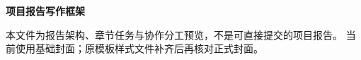 \documentclass[12pt,a4paper,UTF8]{ctexart}
\newif\ifRUCTemplate
\begin{document}
\ifRUCTemplate
  \cover
\else
  \begin{titlepage}
  \centering
  \vspace*{18mm}
  {\bfseries \CourseName\par}
  \vspace{22mm}
  {\bfseries 项目报告写作框架\par}
  \vspace{14mm}
  {\bfseries \ProjectName\par}
  \vspace{3mm}
  {\bfseries \ProjectSubtitle\par}
  \vspace{18mm}
  {\large \TeamInformation\par}
  \vfill
  {\large \ReportDate\par}
  \vspace{8mm}
  \begin{minipage}{.86\linewidth}\small
  本文件为报告架构、章节任务与协作分工预览，不是可直接提交的项目报告。
  当前使用基础封面；原模板样式文件补齐后再核对正式封面。
  \end{minipage}
  \end{titlepage}
\fi
{}

\clearpage
\tableofcontents
\clearpage
{}

\clearpage

\clearpage

\clearpage

\clearpage

\clearpage

\clearpage

\clearpage

\clearpage

\clearpage

\clearpage
{}
{}


\clearpage
\appendix

\clearpage

\end{document}
